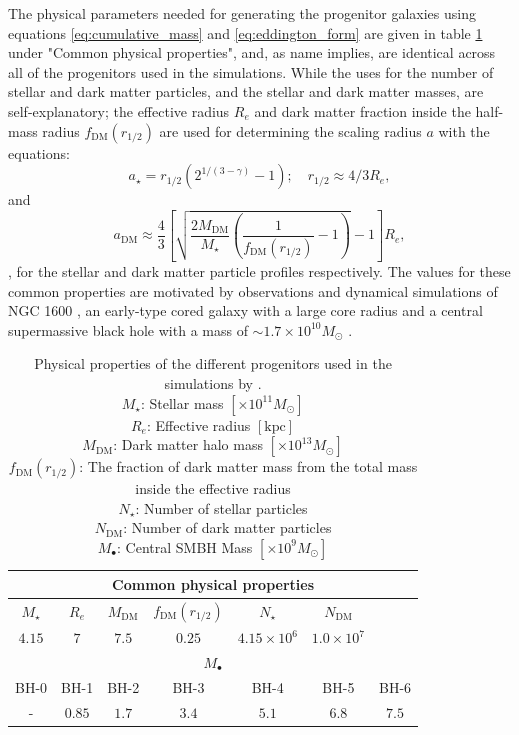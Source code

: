 \documentclass[english, oneside]{HYgradu}
\begin{document}
The physical parameters needed for generating the progenitor galaxies using equations \ref{eq:cumulative_mass} and \ref{eq:eddington_form} are given in table \ref{table:properties} under "Common physical properties", and, as name implies, are identical across all of the progenitors used in the simulations. While the uses for the number of stellar and dark matter particles, and the stellar and dark matter masses, are self-explanatory; the effective radius $R_e$ and dark matter fraction inside the half-mass radius $f_\mathrm{DM}(r_{1/2})$ are used for determining the scaling radius $a$ with the equations:
\begin{equation}
a_\star = r_{1/2}(2^{1/(3-\gamma)}-1); \quad r_{1/2} \approx 4/3 R_e,
\end{equation}
and
\begin{equation}
a_\mathrm{DM} \approx \frac{4}{3} \left[ \sqrt{\frac{2M_\mathrm{DM}}{M_\star} \left( \frac{1}{f_\mathrm{DM}(r_{1/2})} - 1 \right)} -1 \right] R_e,
\end{equation}
, for the stellar and dark matter particle profiles respectively. The values for these common properties are motivated by observations and dynamical simulations of NGC 1600 \citep{Rantala2018}, an early-type cored galaxy with a large core radius and a central supermassive black hole with a mass of $\sim 1.7 \times 10^{10} M_\odot$ \citep{Thomas2016}.

\begin{table}
	\begin{center}
		\begin{tabular}{| c c c c c c c |}
		\hline
		\multicolumn{7}{|c|}{Common physical properties} \\
		\hline
		$M_\star$ & $R_e$ & $M_\mathrm{DM}$ & $f_\mathrm{DM}(r_{1/2})$ & $N_\star$ & $N_\mathrm{DM}$ & \\
		$4.15$ & $7$ & $7.5$ & $0.25$ & $4.15 \times 10^6$ & $1.0 \times 10^7$ & \\
		\hline
		\hline
		\multicolumn{7}{|c|}{$M_\bullet$} \\
		\hline
		BH-0 & BH-1 & BH-2 & BH-3 & BH-4 & BH-5 & BH-6 \\
		- & $0.85$ & $1.7$ & $3.4$ & $5.1$ & $6.8$ & $7.5$ \\
		\hline
		\end{tabular}
	\end{center}
	\caption{Physical properties of the different progenitors used in the simulations by \cite{Rantala2018}. \\
	$M_\star$: Stellar mass $[\times 10^{11} M_\odot]$ \\
	$R_e$: Effective radius $[\mathrm{kpc}]$ \\
	$M_\mathrm{DM}$: Dark matter halo mass $[\times 10^{13} M_\odot]$\\
	$f_\mathrm{DM}(r_{1/2})$: The fraction of dark matter mass from the total mass inside the effective radius \\
	$N_\star$: Number of stellar particles \\
	$N_\mathrm{DM}$: Number of dark matter particles \\
	$M_\bullet$: Central SMBH Mass $[\times 10^9 M_\odot]$}
	\label{table:properties}
\end{table}
\end{document}
